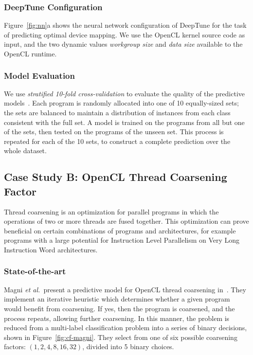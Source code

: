 \subsubsection{DeepTune Configuration} Figure~\ref{fig:nn}a shows the neural network configuration of DeepTune for the task of predicting optimal device mapping. We use the OpenCL kernel source code as input, and the two dynamic values \emph{workgroup size} and \emph{data size} available to the OpenCL runtime.

\subsubsection{Model Evaluation} We use \emph{stratified 10-fold cross-validation} to evaluate the quality of the predictive models~\cite{Han2011}. Each program is randomly allocated into one of 10 equally-sized sets; the sets are balanced to maintain a distribution of instances from each class consistent with the full set. A model is trained on the programs from all but one of the sets, then tested on the programs of the unseen set. This process is repeated for each of the 10 sets, to construct a complete prediction over the whole dataset.






\subsection{Case Study B: OpenCL Thread Coarsening Factor} \label{subsec:case-study-b}



Thread coarsening is an optimization for parallel programs in which the operations of two or more threads are fused together. This optimization can prove beneficial on certain combinations of programs and architectures, for example programs with a large potential for Instruction Level Parallelism on Very Long Instruction Word architectures.

\subsubsection{State-of-the-art} Magni \emph{et al.\ }present a predictive model for OpenCL thread coarsening in~\cite{Magni2014}. They implement an iterative heuristic which determines whether a given program would benefit from coarsening. If yes, then the program is coarsened, and the process repeats, allowing further coarsening. In this manner, the problem is reduced from a multi-label classification problem into a series of binary decisions, shown in Figure~\ref{fig:cf-magni}. They select from one of six possible coarsening factors: $(1, 2, 4, 8, 16, 32)$, divided into 5 binary choices.

